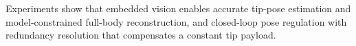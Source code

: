 Experiments show that embedded vision enables accurate tip-pose estimation and model-constrained full-body reconstruction, and closed-loop pose regulation with redundancy resolution that compensates a constant tip payload.
